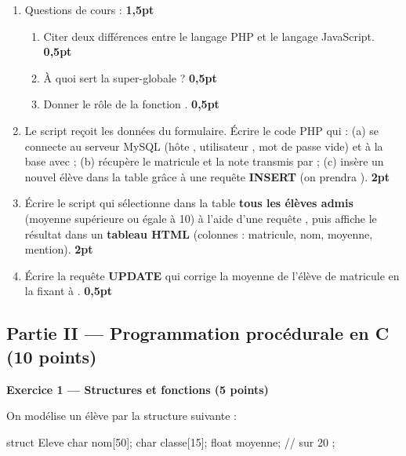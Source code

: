 \begin{enumerate}[label=\textbf{\arabic*-},leftmargin=2.2em]
\item Questions de cours : \hfill \textbf{1,5pt}
  \begin{enumerate}[label=\textbf{\alph*)},leftmargin=2em]
  \item Citer deux différences entre le langage PHP et le langage JavaScript. \hfill \textbf{0,5pt}
  \item À quoi sert la super-globale  ? \hfill \textbf{0,5pt}
  \item Donner le rôle de la fonction . \hfill \textbf{0,5pt}
  \end{enumerate}
\item Le script  reçoit les données du formulaire. Écrire le code
PHP qui : (a) se connecte au serveur MySQL (hôte , utilisateur
, mot de passe vide) et à la base  avec  ;
(b) récupère le matricule et la note transmis par  ; (c) insère un nouvel
élève dans la table  grâce à une requête \textbf{INSERT} (on prendra
). \hfill \textbf{2pt}
\item Écrire le script  qui sélectionne dans la table 
\textbf{tous les élèves admis} (moyenne supérieure ou égale à 10) à l'aide d'une
requête , puis affiche le résultat dans un \textbf{tableau HTML}
(colonnes : matricule, nom, moyenne, mention). \hfill \textbf{2pt}
\item Écrire la requête \textbf{UPDATE} qui corrige la moyenne de l'élève de matricule
 en la fixant à . \hfill \textbf{0,5pt}
\end{enumerate}

\subsection*{Partie II — Programmation procédurale en C \hfill (10 points)}

\textbf{Exercice 1 — Structures et fonctions \hfill (5 points)}

On modélise un élève par la structure suivante :
\begin{codec}
struct Eleve {
  char nom[50];
  char classe[15];
  float moyenne;   // sur 20
};
\end{codec}

